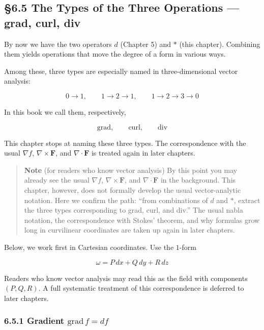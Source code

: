 \documentclass[a4paper,12pt,openany]{book}
\begin{document}
\par\vspace{0.35em}\par

\hypertarget{the-types-of-the-three-operations-grad-curl-div}{%
\subsection{§6.5 The Types of the Three Operations — grad, curl,
div}\label{the-types-of-the-three-operations-grad-curl-div}}

By now we have the two operators \(d\) (Chapter 5) and \(\ast\) (this
chapter). Combining them yields operations that move the degree of a
form in various ways.

Among these, three types are especially named in three-dimensional
vector analysis:

\[
0 \to 1,\qquad
1 \to 2 \to 1,\qquad
1 \to 2 \to 3 \to 0
\]

In this book we call them, respectively,

\[
\mathrm{grad},\qquad
\mathrm{curl},\qquad
\mathrm{div}
\]

This chapter stops at naming these three types. The correspondence with
the usual \(\nabla f\), \(\nabla\times\mathbf F\), and
\(\nabla\cdot\mathbf F\) is treated again in later chapters.

\begin{quote}
\textbf{Note} (for readers who know vector analysis) By this point you
may already see the usual \(\nabla f\), \(\nabla\times\mathbf F\), and
\(\nabla\cdot\mathbf F\) in the background. This chapter, however, does
not formally develop the usual vector-analytic notation. Here we confirm
the path: ``from combinations of \(d\) and \(\ast\), extract the three
types corresponding to grad, curl, and div.'' The usual nabla notation,
the correspondence with Stokes' theorem, and why formulas grow long in
curvilinear coordinates are taken up again in later chapters.
\end{quote}

Below, we work first in Cartesian coordinates. Use the \(1\)-form

\[
\omega = P\,dx + Q\,dy + R\,dz
\]

Readers who know vector analysis may read this as the field with
components \((P,Q,R)\). A full systematic treatment of this
correspondence is deferred to later chapters.

\hypertarget{gradient-mathrmgradf-df}{%
\subsubsection{\texorpdfstring{6.5.1 Gradient
\(\mathrm{grad}\,f = df\)}{6.5.1 Gradient \textbackslash mathrm\{grad\}\textbackslash,f = df}}\label{gradient-mathrmgradf-df}}
\end{document}

